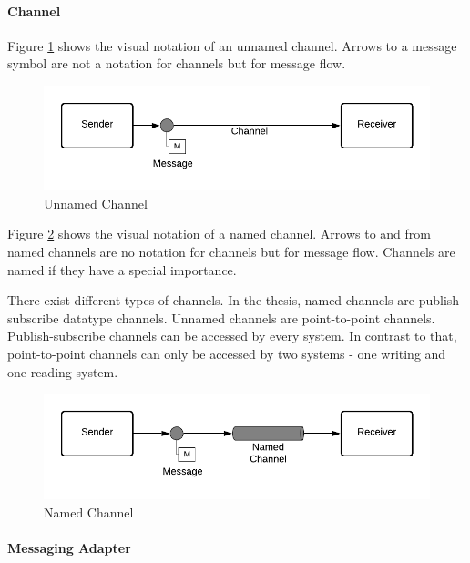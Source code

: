 \paragraph{Channel}

Figure \ref{messaging:channel1} shows the visual notation of an unnamed channel. Arrows to a message symbol are not a notation for channels but for message flow.

\begin{figure}[H]
    \centering
    \includegraphics[scale=0.6]{Diagrams/Messaging/3. Channel.pdf}
    \caption{Unnamed Channel}
    \label{messaging:channel1}
\end{figure}

Figure \ref{messaging:channel2} shows the visual notation of a named channel. Arrows to and from named channels are no notation for channels but for message flow. Channels are named if they have a special importance.

There exist different types of channels. In the thesis, named channels are publish-subscribe datatype channels. Unnamed channels are point-to-point channels. Publish-subscribe channels can be accessed by every system. In contrast to that, point-to-point channels can only be accessed by two systems - one writing and one reading system.

\begin{figure}[H]
    \centering
    \includegraphics[scale=0.6]{Diagrams/Messaging/2. Channel.pdf}
    \caption{Named Channel}
    \label{messaging:channel2}
\end{figure}

\paragraph{Messaging Adapter}

